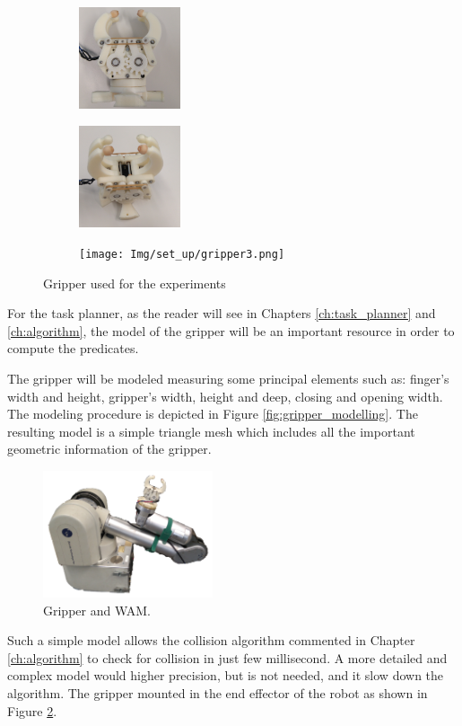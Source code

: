 \begin{figure}[htp]
\centering
\begin{subfigure}[b]{0.3\textwidth}
\centering
\includegraphics[height=3cm]{Img/set_up/gripper1.png}
\end{subfigure}
\begin{subfigure}[b]{0.3\textwidth}
\centering
\includegraphics[height=3cm]{Img/set_up/gripper2.png}
\end{subfigure}
\begin{subfigure}[b]{0.3\textwidth}
\centering
\texttt{[image: Img/set\_up/gripper3.png]}
\end{subfigure}
\caption{Gripper used for the experiments}\label{fig:gripper_general}
\end{figure}

For the task planner, as the reader will see in Chapters \ref{ch:task_planner} and \ref{ch:algorithm}, the model of the gripper will be an important resource 
in order to compute the predicates. 

The gripper will be modeled measuring some principal elements such as: finger's width and height, gripper's width, height and deep, closing and opening width. The modeling procedure is depicted in Figure \ref{fig:gripper_modelling}. The resulting model is a simple triangle mesh which includes all the important geometric information of the gripper.
\begin{figure}[h]
\centering
\includegraphics[width=5.0cm]{Img/set_up/wam_gripper2.png}
\caption{Gripper and WAM.}\label{fig:wam_gripper}
\end{figure}
Such a simple model allows the collision algorithm commented in Chapter \ref{ch:algorithm} to check for collision in just  few millisecond. 
A more detailed and complex model would  higher precision, but  is not needed, and it  slow down the algorithm. 
The gripper  mounted in the end effector of the robot as shown in Figure \ref{fig:wam_gripper}. 


